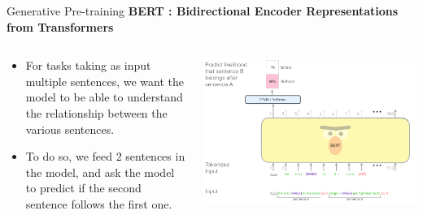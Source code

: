 \documentclass[aspectratio=169]{beamer}
\begin{document}
\begin{frame}{Generative Pre-training}
\centering
\textbf{BERT : Bidirectional Encoder Representations from Transformers \cite{devlin2018bert}}

\begin{columns}
\begin{column}{0.3\textwidth}
\begin{itemize}
	\item For tasks taking as input multiple sentences, we want the model to be able to understand the relationship between the various sentences.
	\item To do so, we feed 2 sentences in the model, and ask the model to predict if the second sentence follows the first one.
\end{itemize}
   
\end{column}
\begin{column}{0.7\textwidth}  %
    \centering

\includegraphics[width=\textwidth]{figures/bert-next-sentence-prediction}

\end{column}
\end{columns}

\end{frame}
\end{document}
